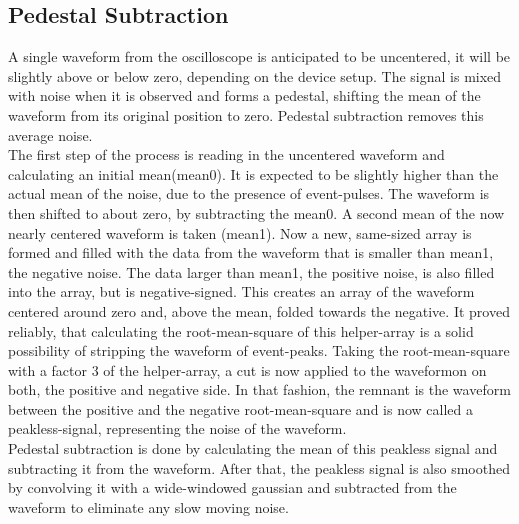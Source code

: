 \documentclass[article,type=msc,colorback,accentcolor=tud9c]{tudthesis}
\begin{document}
\subsection{Pedestal Subtraction}
\begin{wrapfigure}{R}{0.5\textwidth}
\centering
\texttt{[image: D:/OwnCloudData/00\_WriteUp/04\_Thesis/Pic/Analysis/\{HAM\_T22.0\_Vb68.5.trcFiltered1Zoom]}.pdf}
\caption{\label{fig:CHECSTILE}Pedestal subtraction}
\end{wrapfigure}
A single waveform from the oscilloscope is anticipated to be uncentered, it will be slightly above or below zero, depending on the device setup. The signal is mixed with noise when it is observed and forms a pedestal, shifting the mean of the waveform from its original position to zero. Pedestal subtraction removes this average noise.\\
The first step of the process is reading in the uncentered waveform and calculating an initial mean(mean0). It is expected to be slightly higher than the actual mean of the noise, due to the presence of event-pulses. The waveform is then shifted to about zero, by subtracting the mean0. A second mean of the now nearly centered waveform is taken (mean1). Now a new, same-sized array is formed and filled with the data from the waveform that is smaller than mean1, the negative noise. The data larger than mean1, the positive noise, is also filled into the array, but is negative-signed. This creates an array of the waveform centered around zero and, above the mean, folded towards the negative. It proved reliably, that calculating the root-mean-square of this helper-array is a solid possibility of stripping the waveform of event-peaks. Taking the root-mean-square with a factor 3 of the helper-array, a cut is now applied to the waveformon on both, the positive and negative side. In that fashion, the remnant is the waveform between the positive and the negative root-mean-square and is now called a peakless-signal, representing the noise of the waveform.\\
Pedestal subtraction is done by calculating the mean of this peakless signal and subtracting it from the waveform. After that, the peakless signal is also smoothed by convolving it with a wide-windowed gaussian and subtracted from the waveform to eliminate any slow moving noise.


\newpage
\end{document}
